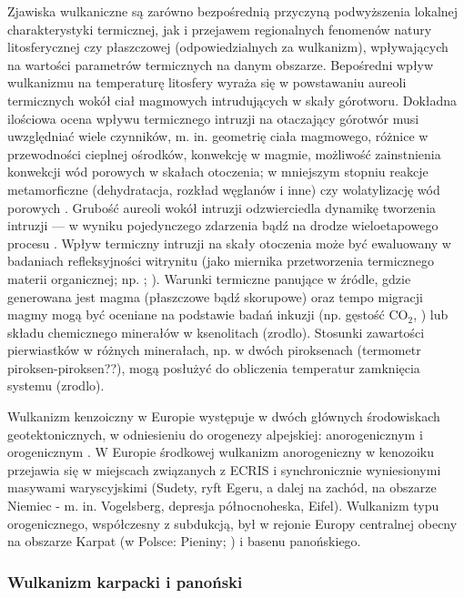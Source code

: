 \documentclass[11.5pt,twoside]{report}
\begin{document}
 Zjawiska wulkaniczne są zarówno bezpośrednią przyczyną podwyższenia lokalnej charakterystyki termicznej, jak i przejawem regionalnych fenomenów natury litosferycznej czy płaszczowej (odpowiedzialnych za wulkanizm), wpływających na wartości parametrów termicznych na danym obszarze. Bepośredni wpływ wulkanizmu na temperaturę litosfery wyraża się w powstawaniu aureoli termicznych wokół ciał magmowych intrudujących w skały górotworu. Dokładna ilościowa ocena wpływu termicznego intruzji na otaczający górotwór musi uwzględniać wiele czynników, m. in. geometrię ciała magmowego, różnice w przewodności cieplnej ośrodków, konwekcję w magmie, możliwość zainstnienia konwekcji wód porowych w skałach otoczenia; w mniejszym stopniu reakcje metamorficzne (dehydratacja, rozkład węglanów i inne) czy wolatylizację wód porowych \parencite{Annen.2017}. Grubość aureoli wokół intruzji odzwierciedla dynamikę tworzenia intruzji --- w wyniku pojedynczego zdarzenia bąd\'{z} na drodze wieloetapowego procesu \parencite{Galushkin.1997}. Wpływ termiczny intruzji na skały otoczenia może być ewaluowany w badaniach refleksyjności witrynitu (jako miernika przetworzenia termicznego materii organicznej; np. \cite{Annen.2017}; \cite{Fjeldskaar.2008}). Warunki termiczne panujące w \'{z}ródle, gdzie generowana jest magma (płaszczowe bąd\'{z} skorupowe) oraz tempo migracji magmy mogą być oceniane na podstawie badań inkuzji (np. gęstość CO$_{2}$, \cite{Ladenberger.2009}) lub składu chemicznego minerałów w ksenolitach (zrodlo). Stosunki zawartości pierwiastków w różnych minerałach, np. w dwóch piroksenach (termometr piroksen-piroksen??), mogą posłużyć do obliczenia temperatur zamknięcia systemu (zrodlo).
 
 Wulkanizm kenzoiczny w Europie występuje w dwóch głównych środowiskach geotektonicznych, w odniesieniu do orogenezy alpejskiej: anorogenicznym i orogenicznym \parencite{Wilson.2006}. W Europie środkowej wulkanizm anorogeniczny w kenozoiku przejawia się w miejscach związanych z ECRIS i synchronicznie wyniesionymi masywami waryscyjskimi (Sudety, ryft Egeru, a dalej na zachód, na obszarze Niemiec - m. in. Vogelsberg, depresja północnoheska, Eifel). Wulkanizm typu orogenicznego, współczesny z subdukcją, był w rejonie Europy centralnej obecny na obszarze Karpat (w Polsce: Pieniny; \cite{Badura.2004}) i basenu panońskiego. 
 
 \subsubsection{Wulkanizm karpacki i panoński}
 
\end{document}
